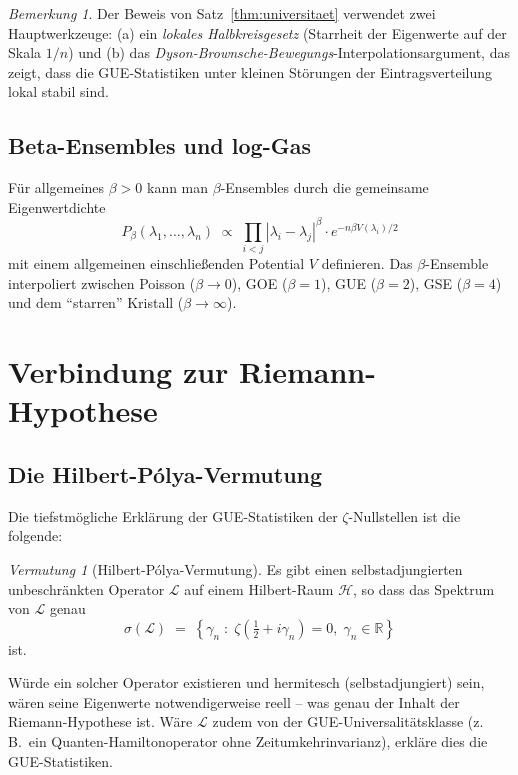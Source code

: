 \documentclass[12pt,a4paper]{amsart}
\theoremstyle{definition}
\theoremstyle{remark}
\newtheorem{bemerkung}[theorem]{Bemerkung}
\newtheorem{vermutung}[theorem]{Vermutung}
\begin{document}
\begin{bemerkung}
Der Beweis von Satz~\ref{thm:universitaet} verwendet zwei Hauptwerkzeuge:
(a) ein \emph{lokales Halbkreisgesetz} (Starrheit der Eigenwerte auf der Skala $1/n$)
und (b) das \emph{Dyson-Brownsche-Bewegungs}-Interpolationsargument, das zeigt,
dass die GUE-Statistiken unter kleinen Störungen der Eintragsverteilung
lokal stabil sind.
\end{bemerkung}

\subsection{Beta-Ensembles und log-Gas}

Für allgemeines $\beta > 0$ kann man $\beta$-Ensembles durch die gemeinsame
Eigenwertdichte
\[
  P_\beta(\lambda_1,\ldots,\lambda_n) \;\propto\;
  \prod_{i<j} |\lambda_i - \lambda_j|^\beta \cdot e^{-n\beta V(\lambda_i)/2}
\]
mit einem allgemeinen einschließenden Potential $V$ definieren. Das
$\beta$-Ensemble interpoliert zwischen Poisson ($\beta \to 0$), GOE ($\beta=1$),
GUE ($\beta=2$), GSE ($\beta=4$) und dem ``starren'' Kristall ($\beta \to \infty$).

\section{Verbindung zur Riemann-Hypothese}
\label{sec:rh}

\subsection{Die Hilbert-Pólya-Vermutung}

Die tiefstmögliche Erklärung der GUE-Statistiken der $\zeta$-Nullstellen
ist die folgende:

\begin{vermutung}[Hilbert-Pólya-Vermutung]
\label{verm:hilbertpolya}
Es gibt einen selbstadjungierten unbeschränkten Operator $\mathcal{L}$ auf einem
Hilbert-Raum $\mathcal{H}$, so dass das Spektrum von $\mathcal{L}$ genau
\[
  \sigma(\mathcal{L}) \;=\; \left\{ \gamma_n \;:\; \zeta\!\left(\tfrac{1}{2} + i\gamma_n\right) = 0,\; \gamma_n \in \mathbb{R} \right\}
\]
ist.
\end{vermutung}

\noindent
Würde ein solcher Operator existieren und hermitesch (selbstadjungiert) sein,
wären seine Eigenwerte notwendigerweise reell -- was genau der Inhalt der
Riemann-Hypothese ist. Wäre $\mathcal{L}$ zudem von der GUE-Universalitätsklasse
(z.\,B.\ ein Quanten-Hamiltonoperator ohne Zeitumkehrinvarianz), erkläre dies
die GUE-Statistiken.
\end{document}

